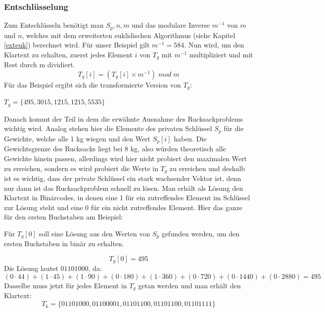 \documentclass[a4paper,12pt,titlepage]{article}
\begin{document}
\subsubsection{Entschlüsselung}
Zum Entschlüsseln benötigt man $S_p,n,m$ und das modulare Inverse $m^{-1}$ von $m$ und $n$, welches mit dem erweiterten euklidischen Algorithmus (siehe Kapitel \ref{exteuk}) berechnet wird.
Für unser Beispiel gilt $m^{-1} = 584$.
Nun wird, um den Klartext zu erhalten, zuerst jedes Element $i$ von $T_g$ mit $m^{-1}$ multipliziert und mit Rest durch m dividiert.
\begin{equation*}
T_g[i] = (T_g[i] \times m^{-1})\; mod \; m
\end{equation*}
Für das Beispiel ergibt sich die transformierte Version von $T_g$:
\begin{center}
$T_g=\{495,3015,1215,1215,5535\}$
\end{center}
Danach kommt der Teil in dem die erwähnte Ausnahme des Rucksackproblems wichtig wird.
Analog stehen hier die Elemente des privaten Schlüssel $S_p$ für die Gewichte, welche alle 1 kg wiegen und den Wert $S_p[i]$ haben. Die Gewichtsgrenze des Rucksacks liegt bei 8 kg, also würden theoretisch alle Gewichte hinein passen, allerdings wird hier nicht probiert den maximalen Wert zu erreichen, sondern es wird probiert die Werte in $T_g$ zu erreichen und deshalb ist es wichtig, dass der private Schlüssel ein stark wachsender Vektor ist, denn nur dann ist das Rucksackproblem schnell zu lösen. Man erhält als Lösung den Klartext in Binärcodes, in denen eine 1 für ein zutreffendes Element im Schlüssel zur Lösung steht und eine 0 für ein nicht zutreffendes Element. \newline Hier das ganze für den ersten Buchstaben am Beispiel:

Für $T_g[0]$ soll eine Lösung aus den Werten von $S_p$ gefunden werden, um den ersten Buchstaben in binär zu erhalten.

\begin{equation*}
T_g[0] = 495
\end{equation*}
Die Lösung lautet $01101000$, da:
\begin{equation*}
(0 \cdot 44) + (1 \cdot 45) + (1 \cdot 90) + (0 \cdot 180) + (1 \cdot 360)  + (0 \cdot 720 )+ (0 \cdot 1440 )+ (0 \cdot 2880) = 495
\end{equation*}
Dasselbe muss jetzt für jedes Element in $T_g$ getan werden und man erhält den Klartext:
\begin{equation*}
T_k = \{01101000, 01100001, 01101100, 01101100, 01101111\}
\end{equation*}
\end{document}

